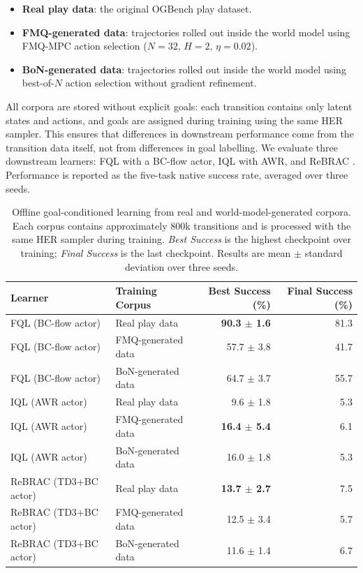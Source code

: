 \begin{itemize}
    \item \textbf{Real play data}: the original OGBench play dataset.
    \item \textbf{FMQ-generated data}: trajectories rolled out inside
    the world model using FMQ-MPC action selection
    ($N=32$, $H=2$, $\eta=0.02$).
    \item \textbf{BoN-generated data}: trajectories rolled out inside
    the world model using best-of-$N$ action selection without gradient
    refinement.
\end{itemize}

All corpora are stored without explicit goals: each transition contains
only latent states and actions, and goals are assigned during training
using the same HER sampler. This ensures that differences in downstream
performance come from the transition data itself, not from differences
in goal labelling.
We evaluate three downstream learners: FQL with a BC-flow actor, IQL
with AWR, and ReBRAC \cite{tarasov2023rebrac}. Performance is reported as the five-task native
success rate, averaged over three seeds.

\begin{table}[h]
\centering
\caption{Offline goal-conditioned learning from real and
world-model-generated corpora. Each corpus contains approximately
$800$k transitions and is processed with the same HER sampler during
training. \emph{Best Success} is the highest checkpoint over training;
\emph{Final Success} is the last checkpoint. Results are mean
$\pm$ standard deviation over three seeds.}
\label{tab:wm-dataset-gen}
\begin{tabular}{llrr}
\toprule
Learner & Training Corpus & Best Success (\%) & Final Success (\%) \\
\midrule
FQL (BC-flow actor) & Real play data & \textbf{90.3 $\pm$ 1.6} & 81.3 \\
FQL (BC-flow actor) & FMQ-generated data & 57.7 $\pm$ 3.8 & 41.7 \\
FQL (BC-flow actor) & BoN-generated data & 64.7 $\pm$ 3.7 & 55.7 \\
\midrule
IQL (AWR actor) & Real play data & 9.6 $\pm$ 1.8 & 5.3 \\
IQL (AWR actor) & FMQ-generated data & \textbf{16.4 $\pm$ 5.4} & 6.1 \\
IQL (AWR actor) & BoN-generated data & 16.0 $\pm$ 1.8 & 5.3 \\
\midrule
ReBRAC (TD3+BC actor) & Real play data & \textbf{13.7 $\pm$ 2.7} & 7.5 \\
ReBRAC (TD3+BC actor) & FMQ-generated data & 12.5 $\pm$ 3.4 & 5.7 \\
ReBRAC (TD3+BC actor) & BoN-generated data & 11.6 $\pm$ 1.4 & 6.7 \\
\bottomrule
\end{tabular}
\end{table}

